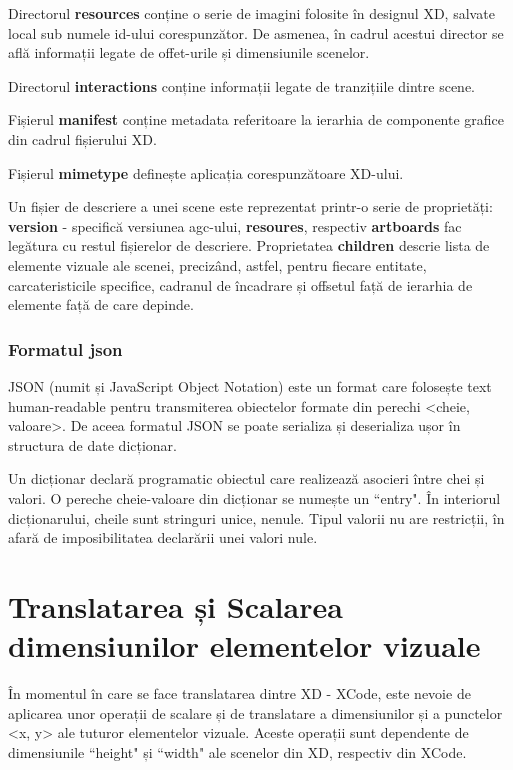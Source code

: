 Directorul  \textbf{resources} conține o serie de imagini folosite în designul XD, salvate local sub numele id-ului corespunzător. De asmenea, în cadrul acestui director se află informații legate de offet-urile și dimensiunile scenelor.

Directorul \textbf{interactions} conține informații legate de tranzițiile dintre scene.

Fișierul \textbf{manifest} conține metadata referitoare la ierarhia de componente grafice din cadrul fișierului XD. 

Fișierul  \textbf{mimetype} definește aplicația corespunzătoare XD-ului.

Un fișier de descriere a unei scene este reprezentat printr-o serie de proprietăți:  \textbf{version} - specifică versiunea agc-ului, \textbf{resoures}, respectiv \textbf{artboards} fac legătura cu restul fișierelor de descriere. Proprietatea  \textbf{children} descrie lista de elemente vizuale ale scenei, precizând, astfel, pentru fiecare entitate, carcateristicile specifice, cadranul de încadrare și offsetul față de ierarhia de elemente față de care depinde.

\subsubsection{Formatul json}

JSON (numit și JavaScript Object Notation) este un format care folosește text human-readable pentru transmiterea obiectelor formate din perechi <cheie, valoare>. De aceea formatul JSON se poate serializa și deserializa ușor în structura de date dicționar.

Un dicționar declară programatic obiectul care realizează asocieri între chei și valori. O pereche cheie-valoare din dicționar se numește un ``entry". În interiorul dicționarului, cheile sunt stringuri unice, nenule. Tipul valorii nu are restricții, în afară de imposibilitatea declarării unei valori nule.

\section{Translatarea și Scalarea dimensiunilor elementelor vizuale}

În momentul în care se face translatarea dintre XD - XCode, este nevoie de aplicarea unor operații de scalare și de translatare a dimensiunilor și a punctelor <x, y> ale tuturor elementelor vizuale. Aceste operații sunt dependente de dimensiunile ``height" și ``width" ale scenelor din XD, respectiv din XCode. 

